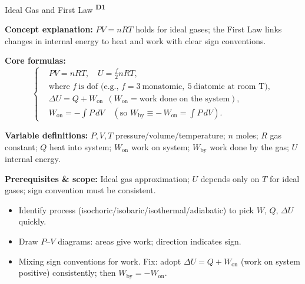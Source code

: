 ﻿\documentclass[12pt,a4paper]{article}
\providecommand{\KPFormulas}{}
\providecommand{\KPHeuristics}{}
\newcommand{\DOne}{\texorpdfstring{\textsuperscript{\textbf{D1}}}{ D1}}
\begin{document}
\begin{KnowledgePoint}{Ideal Gas and First Law \DOne}
  \KPFormulas
  \begin{formulabox}
  \textbf{Concept explanation:} $PV=nRT$ holds for ideal gases; the First Law links changes in internal energy to heat and work with clear sign conventions.

  \textbf{Core formulas:}
  \[
  \left\{\begin{aligned}
      &PV=nRT,\quad U=\tfrac{f}{2}nRT,\\
      &\text{where } f\ \text{is dof (e.g., }f=3\ \text{monatomic},\ 5\ \text{diatomic at room T)},\\
    &\Delta U=Q+W_{\text{on}}\ \ (W_{\text{on}}=\text{work done on the system}),\\
    &W_{\text{on}}=-\int P\,dV\quad (\text{so }W_{\text{by}}\equiv-\,W_{\text{on}}=\int P\,dV).
  \end{aligned}\right.
  \]

  \textbf{Variable definitions:} $P,V,T$ pressure/volume/temperature; $n$ moles; $R$ gas constant; $Q$ heat into system; $W_{\text{on}}$ work on system; $W_{\text{by}}$ work done by the gas; $U$ internal energy.

  

  \textbf{Prerequisites \& scope:} Ideal gas approximation; $U$ depends only on $T$ for ideal gases; sign convention must be consistent.
  \end{formulabox}

  \KPHeuristics
  \begin{heuristicsbox}
  \begin{itemize}[leftmargin=*]
    \item Identify process (isochoric/isobaric/isothermal/adiabatic) to pick $W,\,Q,\,\Delta U$ quickly.
    \item Draw $P$–$V$ diagrams: areas give work; direction indicates sign.
  \end{itemize}
  \vspace{0.4em}
  \begin{itemize}[leftmargin=*]
    \item Mixing sign conventions for work. Fix: adopt $\Delta U=Q+W_{\text{on}}$ (work on system positive) consistently; then $W_{\text{by}}=-W_{\text{on}}$.
  \end{itemize}
  \end{heuristicsbox}


\end{KnowledgePoint}
\end{document}
